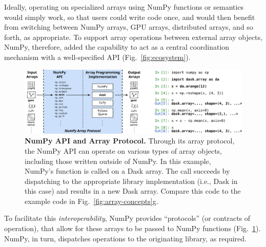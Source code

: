 


Ideally, operating on specialized arrays using NumPy functions or semantics would
simply work, so that users could write code once, and would then benefit
from switching between NumPy arrays, GPU arrays, distributed arrays,
and so forth, as appropriate.
To support array operations between external array objects, NumPy,
therefore, added the capability to act as a central coordination
mechanism with a well-specified API (Fig.~\ref{fig:ecosystem}).

\begin{figure}
  \centering
  \includegraphics[width=\textwidth]{static/sketches/protocol}

  \caption{\textbf{NumPy API and Array Protocol.} Through its array protocol, the NumPy API
     can operate on various types of array objects, including those written outside
     of NumPy. In this example, NumPy's  function is called on a Dask
     array.  The call succeeds by dispatching to the appropriate library implementation
     (i.e., Dask in this case) and results in a new Dask array.  Compare this
     code to the example code in Fig.~\ref{fig:array-concepts}g.
  }\label{fig:array-protocol}

\end{figure}

To facilitate this \emph{interoperability}, NumPy provides
``protocols'' (or contracts of operation), that allow for these arrays to be
passed to NumPy functions (Fig.~\ref{fig:array-protocol}).
NumPy, in turn, dispatches operations to the originating library, as required.

